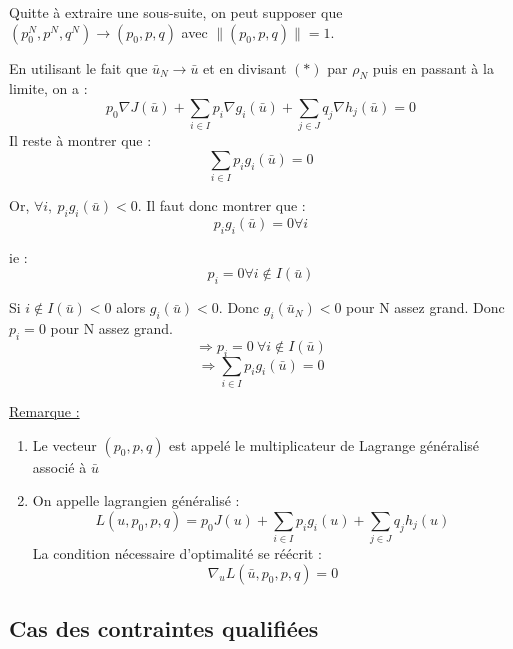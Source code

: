 \begin{dem}
\bigskip
Quitte à extraire une sous-suite, on peut supposer que $(p_0^N, p^N, q^N)\to (p_0,p,q)$ avec $\|(p_0,p,q)\|=1$. 

\bigskip
En utilisant le fait que $\bar{u}_N\to\bar{u}$ et en divisant $(*)$ par $\rho_N$ puis en passant à la limite, on a :
\[p_0\nabla J(\bar{u})+\sum_{i\in I} p_i\nabla g_i(\bar{u})+\sum_{j\in J} q_j\nabla h_j(\bar{u})=0\]
Il reste à montrer que :
\[\sum_{i\in I} p_ig_i(\bar{u})=0\]

Or, $\forall i,\ p_ig_i(\bar{u})<0$. Il faut donc montrer que :
\[p_ig_i(\bar{u})=0 \forall i\]

ie : 
\[p_i=0 \forall i\not\in I(\bar{u})\]

Si $i\not\in I(\bar{u})<0$ alors $g_i(\bar{u})<0$. Donc $g_i(\bar{u}_N)<0$ pour N assez grand. Donc $p_i=0$ pour N assez grand.
\[\Rightarrow p_i=0\ \forall i\not\in I(\bar{u})\]
\[\Rightarrow \sum_{i\in I} p_ig_i(\bar{u})=0\]
\end{dem}

\underline{Remarque :} \begin{enumerate}
\item Le vecteur $(p_0,p,q)$ est appelé le multiplicateur de Lagrange généralisé associé à $\bar{u}$
\item On appelle lagrangien généralisé :
\[L(u,p_0,p,q)=p_0J(u)+\sum_{i\in I} p_ig_i(u)+\sum_{j\in J} q_jh_j(u)\]
La condition nécessaire d'optimalité se réécrit :
\[\nabla_u L(\bar{u},p_0,p,q)=0\]
\end{enumerate}

\subsection{Cas des contraintes qualifiées}



